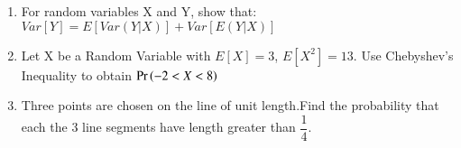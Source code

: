 \renewcommand{\theequation}{\theenumi}
\renewcommand{\thefigure}{\theenumi}
\renewcommand{\thetable}{\theenumi}
\begin{enumerate}[label=\thesection.\arabic*.,ref=\thesection.\theenumi]
%


\item For random variables X and Y, show that:
$Var[Y] = E[Var(Y|X)] + Var[E(Y|X)]$
%
\solution

%
\item Let X be a Random Variable with $E[X] = 3$, $E[X^2] = 13$. Use Chebyshev's Inequality to obtain $\Pr\left(-2 < X < 8\right)$
%
\\
\solution

%
\item  Three points are chosen on the line of unit length.Find the probability that each the 3 line segments have length greater than $\dfrac{1}{4}$.
\\
\solution



\end{enumerate}
